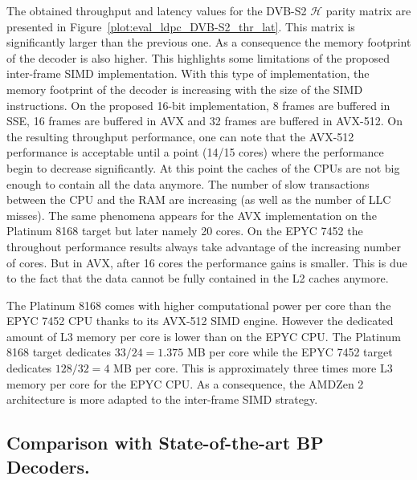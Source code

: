 The obtained throughput and latency values for the DVB-S2 $\mathcal{H}$ parity
matrix are presented in Figure~\ref{plot:eval_ldpc_DVB-S2_thr_lat}. This matrix
is significantly larger than the previous one. As a consequence the memory
footprint of the decoder is also higher. This highlights some limitations of the
proposed inter-frame SIMD implementation. With this type of implementation, the
memory footprint of the decoder is increasing with the size of the SIMD
instructions. On the proposed 16-bit implementation, 8 frames are buffered in
SSE, 16 frames are buffered in AVX and 32 frames are buffered in AVX-512.
On the resulting throughput performance, one can note that the AVX-512
performance is acceptable until a point (14/15 cores) where the performance
begin to decrease significantly. At this point the caches of the CPUs are not
big enough to contain all the data anymore. The number of slow transactions
between the CPU and the RAM are increasing (as well as the number of LLC
misses). The same phenomena appears for the AVX implementation on the Platinum
8168 target but later namely 20 cores. On the EPYC 7452 the throughout
performance results always take advantage of the increasing number of cores. But
in AVX, after 16 cores the performance gains is smaller. This is due to the fact
that the data cannot be fully contained in the L2 caches anymore.

The Platinum 8168 comes with higher computational power per core than the EPYC
7452 CPU thanks to its AVX-512 SIMD engine. However the dedicated amount of L3
memory per core is lower than on the EPYC CPU. The Platinum 8168 target
dedicates $33 / 24 = 1.375$ MB per core while the EPYC 7452 target dedicates
$128 / 32 = 4$ MB per core. This is approximately three times more L3 memory
per core for the EPYC CPU. As a consequence, the AMD\R Zen 2 architecture is
more adapted to the inter-frame SIMD strategy.

\subsection{Comparison with State-of-the-art BP Decoders.}

